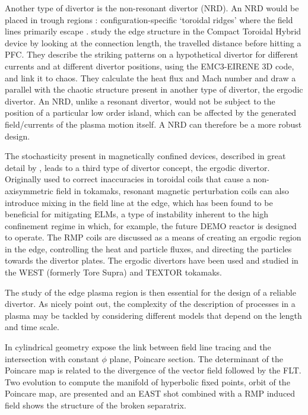 Another type of divertor is the non-resonant divertor (NRD). An NRD would be placed in trough regions : configuration-specific `toroidal ridges' where the field lines primarily escape \cite{bader_hsx_2017}.\cite{garcia_exploration_2023} study the edge structure in the Compact Toroidal Hybrid device by looking at the connection length, the travelled distance before hitting a PFC. They describe the striking patterns on a hypothetical divertor for different currents and at different divertor positions, using the EMC3-EIRENE 3D code, and link it to chaos. They calculate the heat flux and Mach number and draw a parallel with the chaotic structure present in another type of divertor, the ergodic divertor. An NRD, unlike a resonant divertor, would not be subject to the position of a particular low order island, which can be affected by the generated field/currents of the plasma motion itself. A NRD can therefore be a more robust design.

The stochasticity present in magnetically confined devices, described in great detail by \cite{abdullaev_magnetic_2014}, leads to a third type of divertor concept, the ergodic divertor. Originally used to correct inaccuracies in toroidal coils that cause a non-axisymmetric field in tokamaks, resonant magnetic perturbation coils can also introduce mixing in the field line at the edge, which has been found to be beneficial for mitigating ELMs, a type of instability inherent to the high confinement regime in which, for example, the future DEMO reactor is designed to operate. The RMP coils are discussed as a means of creating an ergodic region in the edge, controlling the heat and particle fluxes, and directing the particles towards the divertor plates. The ergodic divertors have been used and studied in the WEST (formerly Tore Supra) and TEXTOR tokamaks.

The study of the edge plasma region is then essential for the design of a reliable divertor. As \cite{imbert-gerard_introduction_2020} nicely point out, the complexity of the description of processes in a plasma may be tackled by considering different models that depend on the length and time scale.


In cylindrical geometry \cite{wei_invariant_2023} expose the link between field line tracing and the intersection with constant $\phi$ plane, Poincare section. The determinant of the Poincare map is related to the divergence of the vector field followed by the FLT. Two evolution to compute the manifold of hyperbolic fixed points, orbit of the Poincare map, are presented and an EAST shot combined with a RMP induced field shows the structure of the broken separatrix.

